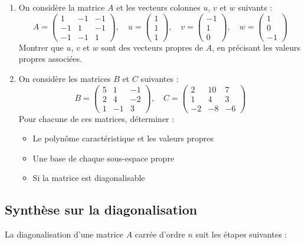 \begin{enumerate}
	\item On considère la matrice $A$ et les vecteurs colonnes $u$, $v$ et $w$ suivants :
	\[
	A = \begin{pmatrix}
	1 & -1 & -1 \\
	-1 & 1 & -1 \\
	-1 & -1 & 1
	\end{pmatrix}, \quad
	u = \begin{pmatrix} 1 \\ 1 \\ 1 \end{pmatrix}, \quad
	v = \begin{pmatrix} -1 \\ 1 \\ 0 \end{pmatrix}, \quad
	w = \begin{pmatrix} 1 \\ 0 \\ -1 \end{pmatrix}
	\]
	Montrer que $u$, $v$ et $w$ sont des vecteurs propres de $A$, en précisant les valeurs propres associées.
	
	\item On considère les matrices $B$ et $C$ suivantes :
	\[
	B = \begin{pmatrix}
	5 & 1 & -1 \\
	2 & 4 & -2 \\
	1 & -1 & 3
	\end{pmatrix}, \quad
	C = \begin{pmatrix}
	2 & 10 & 7 \\
	1 & 4 & 3 \\
	-2 & -8 & -6
	\end{pmatrix}
	\]
	Pour chacune de ces matrices, déterminer :
	\begin{itemize}
		\item Le polynôme caractéristique et les valeurs propres
		\item Une base de chaque sous-espace propre
		\item Si la matrice est diagonalisable
	\end{itemize}
\end{enumerate}

\subsection{Synthèse sur la diagonalisation}

La diagonalisation d'une matrice $A$ carrée d'ordre $n$ suit les étapes suivantes :

